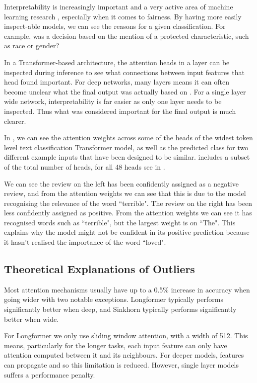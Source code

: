Interpretability is increasingly important and a very active area of machine learning research \citep{interpret1, interpret2}, especially when it comes to fairness.
By having more easily inspect-able models, we can see the reasons for a given classification.
For example, was a decision based on the mention of a protected characteristic, such as race or gender?

In a Transformer-based architecture, the attention heads in a layer can be inspected during inference to see what connections between input features that head found important.
For deep networks, many layers means it can often become unclear what the final output was actually based on \citep{tfm_interpret}.
For a single layer wide network, interpretability is far easier as only one layer needs to be inspected.
Thus what was considered important for the final output is much clearer.

In , we can see the attention weights across some of the heads of the widest token level text classification Transformer model, as well as the predicted class for two different example inputs that have been designed to be similar.
 includes a subset of the total number of heads, for all 48 heads see  in .

We can see the review on the left has been confidently assigned as a negative review, and from the attention weights we can see that this is due to the model recognising the relevance of the word ``terrible".
The review on the right has been less confidently assigned as positive.
From the attention weights we can see it has recognised words such as ``terrible", but the largest weight is on ``The". This explains why the model might not be confident in its positive prediction because it hasn't realised the importance of the word ``loved".


\subsection{Theoretical Explanations of Outliers}\label{sec:theory}

Most attention mechanisms usually have up to a 0.5\% increase in accuracy when going wider with two notable exceptions.
Longformer \citep{longformer} typically performs significantly better when deep, and Sinkhorn \citep{sinkhorn} typically performs significantly better when wide.

For Longformer we only use sliding window attention, with a width of 512.
This means, particularly for the longer tasks, each input feature can only have attention computed between it and its neighbours.
For deeper models, features can propagate and so this limitation is reduced.
However, single layer models suffers a performance penalty.

